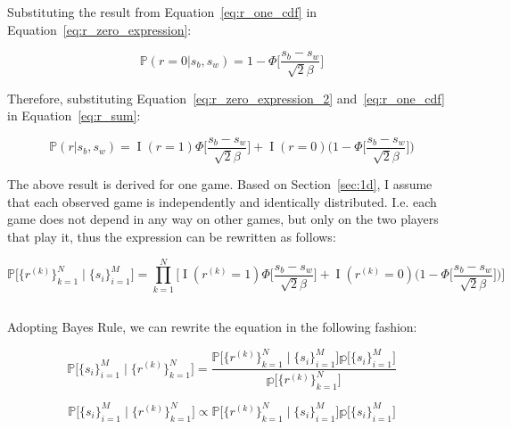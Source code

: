 \documentclass[a4paper,11pt]{article}
\theoremstyle{mytheor}
\begin{document}
Substituting the result from Equation~\ref{eq:r_one_cdf} in Equation~\ref{eq:r_zero_expression}:

\begin{equation}
    \label{eq:r_zero_expression_2}
    \mathbb{P}(r=0|s_b,s_w) = 1 - \Phi\Big[ \frac{s_b-s_w}{\sqrt{2}\beta} \Big]
\end{equation}

Therefore, substituting Equation~\ref{eq:r_zero_expression_2} and~\ref{eq:r_one_cdf} in Equation~\ref{eq:r_sum}:

\begin{equation}
    \label{eq:r_sum_2}
    \mathbb{P}(r|s_b,s_w) = \mathop{I}(r=1)\Phi\Big[ \frac{s_b-s_w}{\sqrt{2}\beta} \Big] + \mathop{I}(r=0)\Big( 1-\Phi\Big[ \frac{s_b-s_w}{\sqrt{2}\beta} \Big] \Big)
\end{equation}

The above result is derived for one game. Based on Section~\ref{sec:1d}, I assume that each observed game is independently and identically distributed. I.e. each game does not depend in any way on other games, but only on the two players that play it, thus the expression can be rewritten as follows:

\begin{equation}
    \label{eq:r_iid}
    \mathbb{P} \Big[ \{r^{(k)}\}_{k=1}^{N}  \mid \{s_i\}_{i=1}^{M} \Big] = \prod_{k=1}^{N}\Big[
    \mathop{I}(r^{(k)}=1)\Phi\Big[ \frac{s_b-s_w}{\sqrt{2}\beta} \Big] + 
    \mathop{I}(r^{(k)}=0)\Big( 1-\Phi\Big[ \frac{s_b-s_w}{\sqrt{2}\beta} \Big] \Big)
    \Big]
\end{equation}

\subsection{}
\label{sec:2f}

Adopting Bayes Rule, we can rewrite the equation in the following fashion:

\begin{equation}
    \label{eq:2_f_bayes}
    \mathbb{P} \Big[ \{s_i\}_{i=1}^{M} \mid \{r^{(k)}\}_{k=1}^{N} \Big] = 
    \frac{\mathbb{P} \Big[ \{r^{(k)}\}_{k=1}^{N}  \mid \{s_i\}_{i=1}^{M} \Big]\mathbb{p} \Big[ \{s_i\}_{i=1}^{M} \Big]}
    {\mathbb{p} \Big[ \{r^{(k)}\}_{k=1}^{N} \Big]}
\end{equation}

\begin{equation}
    \label{eq:2_f_bayes_2}
    \mathbb{P} \Big[ \{s_i\}_{i=1}^{M} \mid \{r^{(k)}\}_{k=1}^{N} \Big] \propto \mathbb{P} \Big[ \{r^{(k)}\}_{k=1}^{N}  \mid \{s_i\}_{i=1}^{M} \Big]\mathbb{p} \Big[ \{s_i\}_{i=1}^{M} \Big]
\end{equation}
\end{document}
